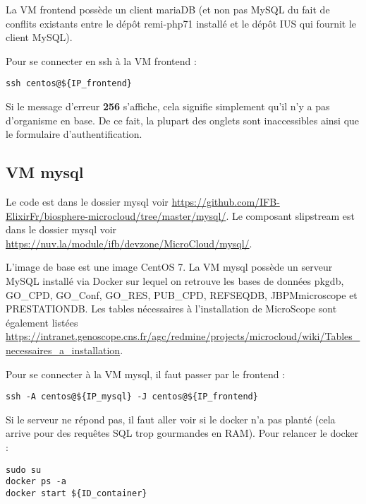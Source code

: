 La VM frontend possède un client mariaDB (et non pas MySQL du fait de conflits existants entre le dépôt remi-php71 installé et le dépôt IUS qui fournit le client MySQL).\newline

Pour se connecter en ssh à la VM frontend : 
\begin{lstlisting}[style=Bash]
ssh centos@${IP_frontend}
\end{lstlisting}

\begin{mycolorbox}Si le message d’erreur \textbf{256} s’affiche, cela signifie simplement qu’il n’y a pas d’organisme en base. De ce fait, la plupart des onglets sont inaccessibles ainsi que le formulaire d’authentification.
\end{mycolorbox}

\subsection {VM mysql}\label{mysql}

Le code est dans le dossier mysql voir \url{https://github.com/IFB-ElixirFr/biosphere-microcloud/tree/master/mysql/}.
Le composant slipstream est dans le dossier mysql voir \url{https://nuv.la/module/ifb/devzone/MicroCloud/mysql/}.

L'image de base est une image CentOS 7. La VM mysql possède un serveur MySQL installé via Docker sur lequel on retrouve les bases de données pkgdb, GO\_CPD, GO\_Conf, GO\_RES, PUB\_CPD, REFSEQDB, JBPMmicroscope et PRESTATIONDB.
\newline
Les tables nécessaires à l'installation de MicroScope sont également listées \url{https://intranet.genoscope.cns.fr/agc/redmine/projects/microcloud/wiki/Tables_necessaires_a_installation}.
\newline

Pour se connecter à la VM mysql, il faut passer par le frontend :
\begin{lstlisting}[style=bash]
ssh -A centos@${IP_mysql} -J centos@${IP_frontend}
\end{lstlisting}
\bigskip

Si le serveur ne répond pas, il faut aller voir si le docker n'a pas planté (cela arrive pour des requêtes SQL trop gourmandes en RAM).
Pour relancer le docker :
\begin{lstlisting}[style=bash]
sudo su
docker ps -a
docker start ${ID_container}
\end{lstlisting}


